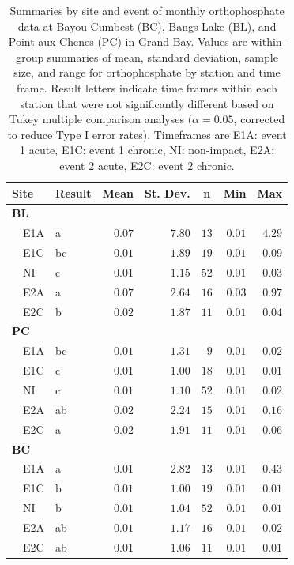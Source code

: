\documentclass[letterpaper,12pt]{article}\usepackage[]{graphicx}\usepackage[]{color}
\newcommand{\beginsupplement}{%
        \setcounter{table}{0}
        \renewcommand{\thetable}{S\arabic{table}}%
        \setcounter{figure}{0}
        \renewcommand{\thefigure}{S\arabic{figure}}%
     }
\begin{document}
\begin{table}[!tbp]
\caption{Summaries by site and event of monthly orthophosphate data at Bayou Cumbest (BC), Bangs Lake (BL), and Point aux Chenes (PC) in Grand Bay.  Values are within-group summaries of mean, standard deviation, sample size, and range for orthophosphate by station and time frame.  Result letters indicate time frames within each station that were not significantly different based on Tukey multiple comparison analyses ($\alpha = 0.05$, corrected to reduce Type I error rates). Timeframes are E1A: event 1 acute, E1C: event 1 chronic, NI: non-impact, E2A: event 2 acute, E2C: event 2 chronic.\label{tab:orthtab}} 
\begin{center}
\begin{tabular}{llrrrrr}
\hline\hline
\multicolumn{1}{l}{Site}&\multicolumn{1}{c}{Result}&\multicolumn{1}{c}{Mean}&\multicolumn{1}{c}{St. Dev.}&\multicolumn{1}{c}{n}&\multicolumn{1}{c}{Min}&\multicolumn{1}{c}{Max}\tabularnewline
\hline
{\bfseries BL}&&&&&&\tabularnewline
~~E1A&a&$0.07$&$7.80$&$13$&$0.01$&$4.29$\tabularnewline
~~E1C&bc&$0.01$&$1.89$&$19$&$0.01$&$0.09$\tabularnewline
~~NI&c&$0.01$&$1.15$&$52$&$0.01$&$0.03$\tabularnewline
~~E2A&a&$0.07$&$2.64$&$16$&$0.03$&$0.97$\tabularnewline
~~E2C&b&$0.02$&$1.87$&$11$&$0.01$&$0.04$\tabularnewline
\hline
{\bfseries PC}&&&&&&\tabularnewline
~~E1A&bc&$0.01$&$1.31$&$ 9$&$0.01$&$0.02$\tabularnewline
~~E1C&c&$0.01$&$1.00$&$18$&$0.01$&$0.01$\tabularnewline
~~NI&c&$0.01$&$1.10$&$52$&$0.01$&$0.02$\tabularnewline
~~E2A&ab&$0.02$&$2.24$&$15$&$0.01$&$0.16$\tabularnewline
~~E2C&a&$0.02$&$1.91$&$11$&$0.01$&$0.06$\tabularnewline
\hline
{\bfseries BC}&&&&&&\tabularnewline
~~E1A&a&$0.01$&$2.82$&$13$&$0.01$&$0.43$\tabularnewline
~~E1C&b&$0.01$&$1.00$&$19$&$0.01$&$0.01$\tabularnewline
~~NI&b&$0.01$&$1.04$&$52$&$0.01$&$0.01$\tabularnewline
~~E2A&ab&$0.01$&$1.17$&$16$&$0.01$&$0.02$\tabularnewline
~~E2C&ab&$0.01$&$1.06$&$11$&$0.01$&$0.01$\tabularnewline
\hline
\end{tabular}\end{center}

\end{table}

\clearpage

\beginsupplement
\end{document}
